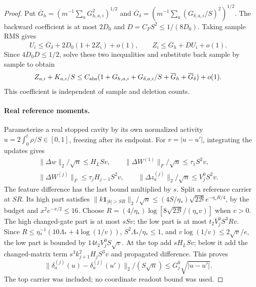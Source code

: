 \begin{proof}
Put \(\overline G_h=(m^{-1}\sum_aG_{h,a,i}^2)^{1/2}\) and
\(\overline G_\delta=(m^{-1}\sum_a(G_{\delta,a,i}/S)^2)^{1/2}\).
The backward coefficient is at most \(2D_0\) and
\(D=C_FS^2\le1/(8D_0)\).  Taking sample RMS gives
\[
 U_i\le\overline G_\delta+2D_0(1+2Z_i)+o(1),\qquad
 Z_i\le\overline G_h+DU_i+o(1).
\]
Since \(4D_0D\le1/2\), solve these two inequalities and substitute
back sample by sample to obtain
\begin{equation}
 Z_{a,i}+K_{a,i}/S\le C_{\rm abs}
 (1+G_{h,a,i}+G_{\delta,a,i}/S+
                     \overline G_h+\overline G_\delta)+o(1).
 \label{cp:src-scalar-absorption}
\end{equation}
This coefficient is independent of sample and deletion counts.

\paragraph{Real reference moments.}
Parameterize a real stopped cavity by its own normalized activity
\(u=2\int_0^t\rho/S\in[0,1]\), freezing after its endpoint.
For \(v=|u-u'|\), integrating the updates gives
\begin{gather*}
 \|\Delta w\|_2/\sqrt n\le H_LSv,\qquad
 \|\Delta W^{(1)}\|_F/\sqrt n\le\tau_1S^2v,\\
 \|\Delta W^{(j)}\|_F\le\tau_jH_{j-1}S^2v,\qquad
 \|\Delta z_a^{(j)}\|_2/\sqrt n\le V_j^0S^2v.
\end{gather*}
The feature difference has the last bound multiplied by \(s\).
Split a reference carrier at \(SR\).  Its high part satisfies
\(\|k\mathbf1_{|k|>SR}\|_2/\sqrt n
\le(4S/\eta_*)\sqrt{2\mathcal B}e^{-\eta_*R/4}\), by the
budget and \(x^2e^{-x/2}\le16\).
Choose \(R=(4/\eta_*)\log[8\sqrt{2\mathcal B}/(\eta_*v)]\)
when \(v>0\).  The high changed-gate part is at most \(sSv\);
the low part is at most \(t_2V_j^0S^3Rv\).  Since
\(R\le\eta_*^{-1}(10\Lambda_*+4\log(1/v))\),
\(S^2\Lambda_*/\eta_*\le1\), and
\(v\log(1/v)\le2\sqrt v/e\), the low part is bounded by
\(14t_2V_j^0S\sqrt v\).  At the top add \(sH_LSv\);
below it add the changed-matrix term
\(s^3k_{j+1}^2H_jS^3v\) and propagated difference.  This proves
\begin{equation}
 \|\delta_a^{(j)}(u)-\delta_a^{(j)}(u')\|_2/(S\sqrt n)
                 \le G_j^0\sqrt{|u-u'|}.
 \label{cp:src-real-modulus}
\end{equation}
The top carrier was included; no coordinate readout bound was used.


\end{proof}
